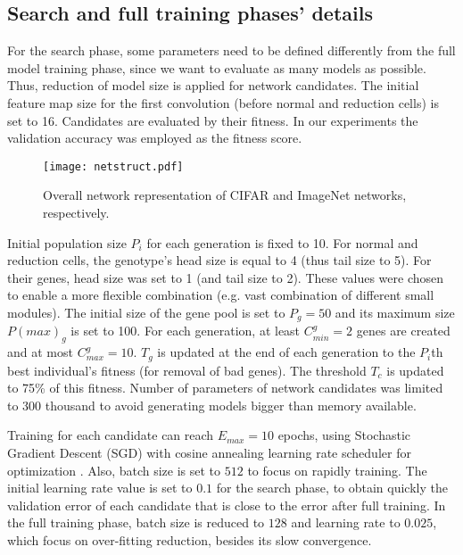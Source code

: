\documentclass[conference]{IEEEtran}
\begin{document}
	\subsection{Search and full training phases' details}
	
	For the search phase, some parameters need to be defined differently from the full model training phase, since we want to evaluate as many models as possible.
	Thus, reduction of model size is applied for network candidates.
	The initial feature map size for the first convolution (before normal and reduction cells) is set to 16.
	Candidates are evaluated by their fitness.
	In our experiments the validation accuracy was employed as the fitness score.
	
	\begin{figure*}[hbt]
		\centering
		\texttt{[image: netstruct.pdf]}
		\caption{Overall network representation of CIFAR and ImageNet networks, respectively.}
		\label{fig:cifar_and_imagenet}
	\end{figure*}
	
	Initial population size $P_i$ for each generation is fixed to 10.
	For normal and reduction cells, the genotype's head size is equal to 4 (thus tail size to 5). 
	For their genes, head size was set to 1 (and tail size to 2).
	These values were chosen to enable a more flexible combination (e.g. vast combination of different small modules).
	The initial size of the gene pool is set to $P_g=50$ and its maximum size $P(max)_g$ is set to 100. For each generation, at least $C^g_{min} = 2$ genes are created and at most $C^g_{max} = 10$.
	$T_g$ is updated at the end of each generation to the $P_i$th best individual's fitness (for removal of bad genes).
	The threshold $T_c$ is updated to 75\% of this fitness.
	Number of parameters of network candidates was limited to 300 thousand to avoid generating models bigger than memory available.
	
	Training for each candidate can reach $E_{max} = 10$ epochs, using Stochastic Gradient Descent (SGD) with cosine annealing learning rate scheduler for optimization \cite{loshchilov2016sgdr}.
	Also, batch size is set to $512$ to focus on rapidly training.
	The initial learning rate value is set to $0.1$ for the search phase, to obtain quickly the validation error of each candidate that is close to the error after full training.
	In the full training phase, batch size is reduced to $128$ and learning rate to $0.025$, which focus on over-fitting reduction, besides its slow convergence.
	
\end{document}
